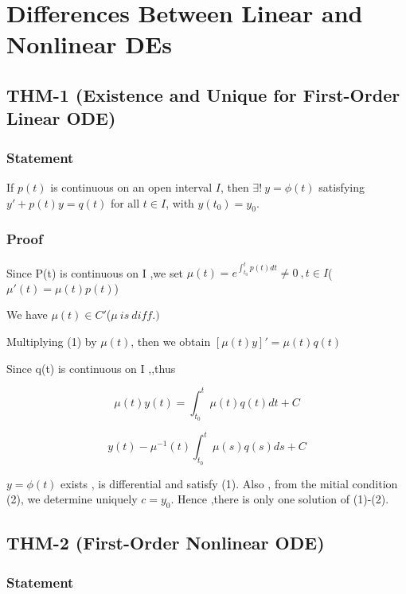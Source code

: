 \documentclass[12pt, a4paper]{article}
\theoremstyle{break}
\begin{document}
\section{Differences Between Linear and Nonlinear DEs}\label{differences-between-linear-and-nonlinear-des}

\subsection{THM-1 (Existence and Unique for First-Order Linear ODE)}\label{thm-1-existence-and-unique-for-first-order-linear-ode}

\subsubsection{Statement}\label{statement}

If \(p(t)\) is continuous on an open interval \(I\), then \(\exists!\ y=\phi(t)\) satisfying \(y' + p(t)y = q(t)\) for all \(t \in I\), with \(y(t_0)=y_0\).

\subsubsection{Proof}\label{proof}

Since P(t) is continuous on I ,we set \(\mu(t) = e^{\int_{t_0}^{t}p(t)dt} \neq0 \ ,t \in I\)(\(\mu '(t) = \mu(t) p(t)\))

We have \(\mu(t) \in  C'\)(\(\mu \ is \ diff.)\)

Multiplying (1) by \(\mu(t)\), then we obtain \([\mu(t)y]' = \mu(t)q(t)\)

Since q(t) is continuous on I ,,thus

\[
\mu(t) y(t) = \int _{t_0}^{t} \mu(t)q(t) dt +C
\]

\[
y(t) - \mu^{-1}(t) \int_{t_0}^{t} \mu(s)q(s)ds + C
\]

\(y = \phi(t)\) exists , is differential and satisfy (1). Also , from the mitial condition (2), we determine uniquely \(c = y_0\). Hence ,there is only one solution of (1)-(2).

\subsection{THM-2 (First-Order Nonlinear ODE)}\label{thm-2-first-order-nonlinear-ode}

\subsubsection{Statement}\label{statement-1}
\end{document}
